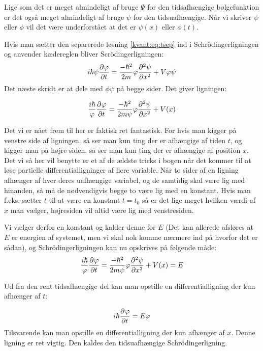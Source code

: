 \documentclass[../Kvantemekanik.tex]{subfiles}
\begin{document}
Lige som det er meget almindeligt af bruge $\Psi$ for den tidsafhængige bølgefunktion er det også meget almindeligt af bruge $\psi$ for den tidsuafhængige. Når vi skriver $\psi$ eller $\phi$ vil det være underforstået at det er $\psi(x)$ eller $\phi(t)$.

Hvis man sætter den separerede løsning \eqref{kvant:eq:tsep} ind i Schrödingerligningen og anvender kædereglen bliver Scrödingerligningen:
\begin{equation}
i\hbar \psi \pdif{t}\phi = \frac{-\hbar^2}{2m}\phi\pdif[2]{x}\psi+V\phi\psi
\end{equation}
Det næste skridt er at dele med $\phi\psi$ på begge sider. Det giver ligningen:

\begin{equation}
\frac{i\hbar}{\phi} \pdif{t}\phi = \frac{-\hbar^2}{2m\psi}\phi\pdif[2]{x}\psi+V(x)
\end{equation}

Det vi er nået frem til her er faktisk ret fantastisk. For hvis man kigger på venstre side af ligningen, så ser man kun ting der er afhængige af tiden $t$, og kigger man på højre siden, så ser man kun ting der er afhængige af position $x$. Det vi så her vil benytte er et af de ældste tricks i bogen når det kommer til at løse partielle differentialligninger af flere variable. Når to sider af en ligning afhænger af hver deres uafhængige variabel, og de samtidig skal være lig med hinanden, så må de nødvendigvis begge to være lig med en konstant. Hvis man f.eks. sætter $t$ til at være en konstant $t=t_0$ så er det lige meget hvilken værdi af $x$ man vælger, højresiden vil altid være lig med venstresiden.

Vi vælger derfor en konstant og kalder denne for $E$ (Det kan allerede afsløres at $E$ er energien af systemet, men vi skal nok komme nærmere ind på hvorfor det er sådan), og Schrödingerligningen kan nu opskrives på følgende måde:
\begin{equation}
\frac{i\hbar}{\phi} \pdif{t}\phi = \frac{-\hbar^2}{2m\psi}\phi\pdif[2]{x}\psi+V(x) = E
\end{equation}

Ud fra den rent tidsafhængige del kan man opstille en differentialligning der kun afhænger af $t$:

\begin{equation}
i\hbar\pdif{t}\phi = E\phi
\end{equation}
Tilsvarende kan man opstille en differentialligning der kun afhænger af $x$. Denne ligning er ret vigtig. Den kaldes den tidsuafhængige Schrödingerligning.
\end{document}

